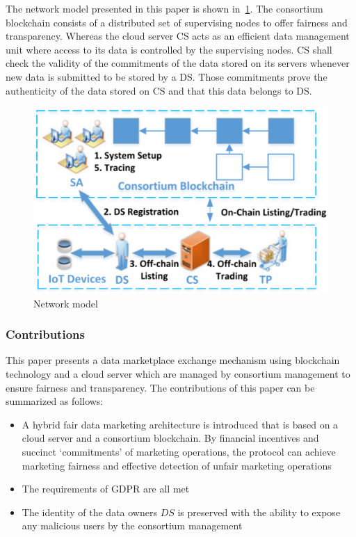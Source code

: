 The network model presented in this paper is shown in~\cref{fig:22-network-model}.
The consortium blockchain consists of a distributed set of supervising nodes to offer fairness and transparency.
Whereas the cloud server CS acts as an efficient data management unit where access to its data is controlled by the supervising nodes.
CS shall check the validity of the commitments of the data stored on its servers whenever new data is submitted to be stored by a DS. 
Those commitments prove the authenticity of the data stored on CS and that this data belongs to DS.

\begin{figure}
\centering
  \includegraphics[width=0.9\linewidth]{imgs/22-network-model.eps}
  \caption{Network model~\cite{liu2022blockchain}}
  \label{fig:22-network-model}
\end{figure}

\subsubsection{Contributions}

This paper presents a data marketplace exchange mechanism using blockchain technology and a cloud server which are managed by consortium management to ensure fairness and transparency.
The contributions of this paper can be summarized as follows:

\begin{itemize}
    \item A hybrid fair data marketing architecture is introduced that is based on a cloud server and a consortium blockchain.
    By financial incentives and succinct ‘commitments’ of marketing operations, the protocol can achieve marketing fairness and effective detection of unfair marketing operations
    \item The requirements of GDPR are all met
    \item The identity of the data owners $DS$ is preserved with the ability to expose any malicious users by the consortium management 
\end{itemize}

